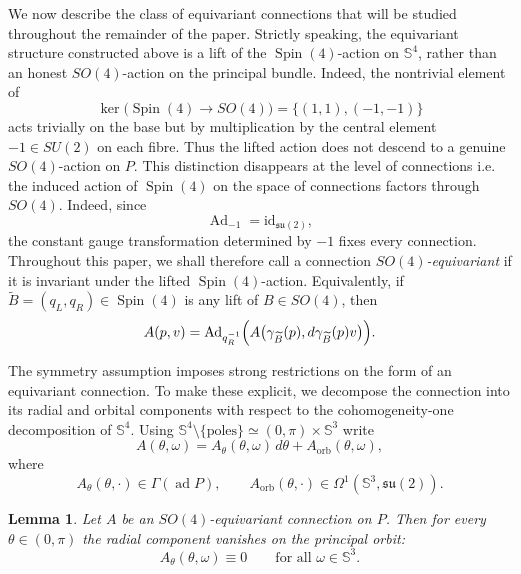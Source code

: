 \documentclass[11pt,a4paper]{article}
\numberwithin{equation}{section}
\theoremstyle{plain}
\newtheorem{lemma}[theorem]{Lemma}
\theoremstyle{remark}
\begin{document}
We now describe the class of equivariant connections that will be studied
throughout the remainder of the paper. Strictly speaking, the equivariant structure constructed above is a lift of
the $\operatorname{Spin}(4)$-action on $\mathbb S^4$, rather than an honest
$SO(4)$-action on the principal bundle. Indeed, the nontrivial element of
$$
\ker\!\bigl(\operatorname{Spin}(4)\rightarrow SO(4)\bigr)
=
\{(1,1),(-1,-1)\}
$$
acts trivially on the base but by multiplication by the central element
$-1\in SU(2)$ on each fibre. Thus the lifted action does not descend to a
genuine $SO(4)$-action on $P$. This distinction disappears at the level of connections i.e. the induced action of
$\operatorname{Spin}(4)$ on the space of connections factors through
$SO(4)$. Indeed, since
$$
\operatorname{Ad}_{-1}
=
\mathrm{id}_{\mathfrak{su}(2)},
$$
the constant gauge transformation determined by $-1$ fixes every
connection. Throughout this paper, we shall therefore call a connection
\emph{$SO(4)$-equivariant} if it is invariant under the lifted
$\operatorname{Spin}(4)$-action. Equivalently, if
$\widetilde B=(q_L,q_R)\in\operatorname{Spin}(4)$ is any lift of
$B\in SO(4)$, then
\begin{equation}
A(p,v)
=
\operatorname{Ad}_{q_R^{-1}}
\Bigl(
A\bigl(
\gamma_{\widetilde B}(p),
d\gamma_{\widetilde B}(p)v
\bigr)
\Bigr).
\end{equation}

The symmetry assumption imposes strong restrictions on the form of an
equivariant connection. To make these explicit, we decompose the
connection into its radial and orbital components with respect to the
cohomogeneity-one decomposition of $\mathbb S^4$. Using $\mathbb S^4\setminus\{\text{poles}\}
\simeq
(0,\pi)\times\mathbb S^3$ write
$$
A(\theta,\omega)
=
A_\theta(\theta,\omega)\,d\theta
+
A_{\mathrm{orb}}(\theta,\omega),
$$
where
$$
A_\theta(\theta,\cdot)
\in
\Gamma(\operatorname{ad}P),
\qquad
A_{\mathrm{orb}}(\theta,\cdot)
\in
\Omega^1(\mathbb S^3,\mathfrak{su}(2)).
$$
\begin{lemma}
    Let $A$ be an $SO(4)$-equivariant connection on $P$. Then for every $\theta\in(0,\pi)$ the radial component
    vanishes on the principal orbit:
    $$
    A_\theta(\theta,\omega)\equiv 0\qquad\text{for all }\omega\in \mathbb{S}^3.
    $$
\end{lemma}
\end{document}
